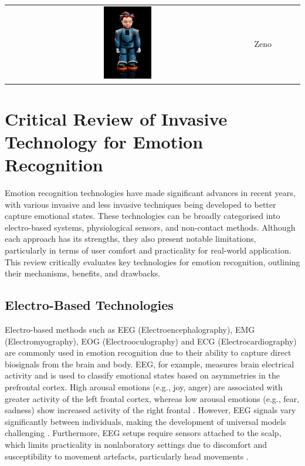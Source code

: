 \begin{table}[ht]
{\begin{tabularx}{1.3\textwidth}{ c|X|X|c|c|}
\cline{2-5}
\includegraphics[width=0.2\textwidth]{robot_table/Zeno.png} & Zeno    & & & \cite{8578328}  \\
\cline{2-5}
\end{tabularx}
}
\end{table}
\clearpage{}

\section{Critical Review of Invasive Technology for Emotion Recognition}
Emotion recognition technologies have made significant advances in recent years, with various invasive and less invasive techniques being developed to better capture emotional states. These technologies can be broadly categorised into electro-based systems, physiological sensors, and non-contact methods. Although each approach has its strengths, they also present notable limitations, particularly in terms of user comfort and practicality for real-world application. This review critically evaluates key technologies for emotion recognition, outlining their mechanisms, benefits, and drawbacks.

\subsection{Electro-Based Technologies}
Electro-based methods such as EEG (Electroencephalography), EMG (Electromyography), EOG (Electrooculography) and ECG (Electrocardiography) are commonly used in emotion recognition due to their ability to capture direct biosignals from the brain and body. EEG, for example, measures brain electrical activity and is used to classify emotional states based on asymmetries in the prefrontal cortex. High arousal emotions (e.g., joy, anger) are associated with greater activity of the left frontal cortex, whereas low arousal emotions (e.g., fear, sadness) show increased activity of the right frontal \cite{Suhaila2021-dh}. However, EEG signals vary significantly between individuals, making the development of universal models challenging \cite{Pal2021-eq}. Furthermore, EEG setups require sensors attached to the scalp, which limits practicality in nonlaboratory settings due to discomfort and susceptibility to movement artefacts, particularly head movements \cite{Tan2021-ai}.

